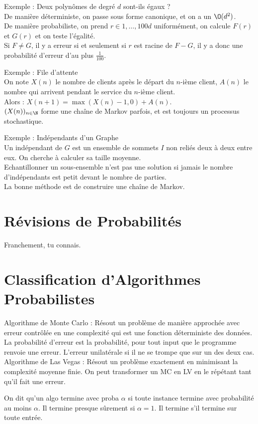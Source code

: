 \documentclass{cours}
\begin{document}
Exemple : Deux polynômes de degré $d$ sont-ils égaux ? \\
De manière déterministe, on passe sous forme canonique, et on a un $\O(d^2)$.\\
De manière probabiliste, on prend $r \in {1, \ldots, 100d}$ uniformément, on calcule $F(r)$ et $G(r)$ et on teste l'égalité.\\
Si $F \neq G$, il y a erreur si et seulement si $r$ est racine de $F-G$, il y a donc une probabilité d'erreur d'au plus $\frac{1}{100}$. 

Exemple : File d'attente\\
On note $X(n)$ le nombre de clients après le départ du $n$-ième client, $A(n)$ le nombre qui arrivent pendant le service du $n$-ième client. \\
Alors : $X(n+1) = \max(X(n)-1, 0) + A(n)$.\\
$(X(n))_{n\in\N}$ forme une chaîne de Markov parfois, et est toujours un processus stochastique. 

Exemple : Indépendants d'un Graphe\\
Un indépendant de $G$ est un ensemble de sommets $I$ non reliés deux à deux entre eux. On cherche à calculer sa taille moyenne.\\
Echantillonner un sous-ensemble n'est pas une solution si jamais le nombre d'indépendants est petit devant le nombre de parties.\\
La bonne méthode est de construire une chaîne de Markov. 

\section{Révisions de Probabilités}
Franchement, tu connais. 

\section{Classification d'Algorithmes Probabilistes}
Algorithme de Monte Carlo : Résout un problème de manière approchée avec erreur contrôlée en une complexité qui est une fonction déterministe des données. \\
La probabilité d'erreur est la probabilité, pour tout input que le programme renvoie une erreur. L'erreur unilatérale si il ne se trompe que sur un des deux cas. \\

Algorithme de Las Vegas : Résout un problème exactement en minimisant la complexité moyenne finie. On peut transformer un MC en LV en le répétant tant qu'il fait une erreur.

On dit qu'un algo termine avec proba $\alpha$ si toute instance termine avec probabilité au moins $\alpha$. Il termine presque sûrement si $\alpha = 1$. Il termine s'il termine sur toute entrée. 
\end{document}
